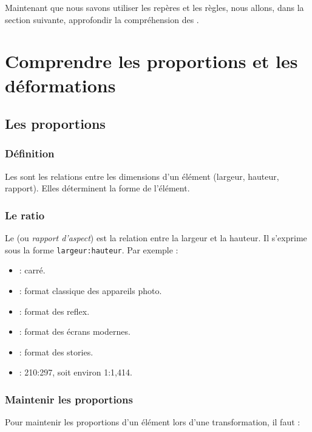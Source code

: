 Maintenant que nous savons utiliser les repères et les règles, nous allons, dans la section suivante, approfondir la compréhension des .

\section{Comprendre les proportions et les déformations}

\subsection{Les proportions}

\subsubsection{Définition}

Les  sont les relations entre les dimensions d'un élément (largeur, hauteur, rapport). Elles déterminent la forme de l'élément.

\subsubsection{Le ratio}

Le  (ou \emph{rapport d'aspect}) est la relation entre la largeur et la hauteur. Il s'exprime sous la forme \texttt{largeur:hauteur}. Par exemple :

\begin{itemize}
    \item {} : carré.
    \item {} : format classique des appareils photo.
    \item {} : format des reflex.
    \item {} : format des écrans modernes.
    \item {} : format des stories.
    \item {} : 210:297, soit environ 1:1,414.
\end{itemize}

\subsubsection{Maintenir les proportions}

Pour maintenir les proportions d'un élément lors d'une transformation, il faut :


